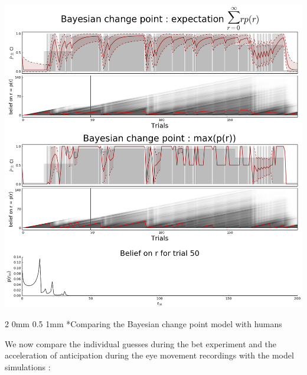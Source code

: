 \documentclass[profile,final,english, draft]{sciposter}%
\makeatletter
\renewcommand{\subsection}{\@startsection
        {subsection}%
        {2}%
        {0mm}%
        {0.5\baselineskip}%
        {1mm}%
        {\normalsize\color[rgb]{0.4,0,0}\bfseries}}%
\makeatother
\begin{document}
\begin{multicols}{3}
\begin{center} 
    \includegraphics[width=1\columnwidth]{bayesianchangepoint}
\end{center}




\subsection*{Comparing the Bayesian change point model with humans}

We now compare the individual guesses during the bet experiment and the acceleration of anticipation during the eye movement recordings with the model simulations :


\end{multicols}
\end{document}
